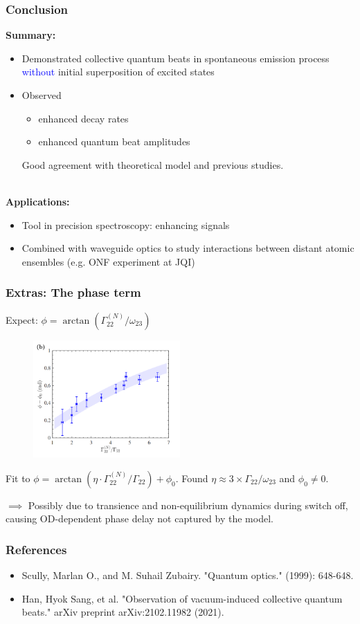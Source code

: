 \documentclass{beamer}
\theoremstyle{definition}
\begin{document}
\begin{frame}
	
	\frametitle{Conclusion}
	\textbf{Summary:}
	
	\begin{itemize}
		\item Demonstrated collective quantum beats in spontaneous emission process \textcolor{blue}{without} initial superposition of excited states
		
		\item Observed 
		\begin{itemize}
			\item enhanced decay rates
			\item enhanced quantum beat amplitudes 
		\end{itemize}
		Good agreement with theoretical model and previous studies.

	\end{itemize}


	$\,$\\
	\textbf{Applications:}
	\begin{itemize}
		\item Tool in precision spectroscopy: enhancing signals
		
		\item Combined with waveguide optics to study interactions between distant atomic ensembles (e.g. ONF experiment at JQI)
	\end{itemize}
\end{frame}



\begin{frame}
	\frametitle{Extras: The phase term}
	Expect: $\phi = \arctan(\Gamma_{22}^{(N)}/\omega_{23})$
	\begin{figure}[!htb]
		\centering
		\includegraphics[width=0.5\textwidth]{phase}
	\end{figure}
	Fit to $
	\phi = \arctan(\eta \cdot \Gamma_{22}^{(N)}/\Gamma_{22}) + \phi_0$. Found $\eta \approx 3 \times \Gamma_{22}/\omega_{23}$ and $\phi_0 \neq 0$. 
	
	$\implies$ Possibly due to transience and non-equilibrium dynamics during switch off, causing OD-dependent phase delay not captured by the model. 
	
\end{frame}


\begin{frame}
\frametitle{References}
\begin{itemize}
	\item Scully, Marlan O., and M. Suhail Zubairy. "Quantum optics." (1999): 648-648.
	
	\item Han, Hyok Sang, et al. "Observation of vacuum-induced collective quantum beats." arXiv preprint arXiv:2102.11982 (2021).
\end{itemize}
\end{frame}
\end{document}
